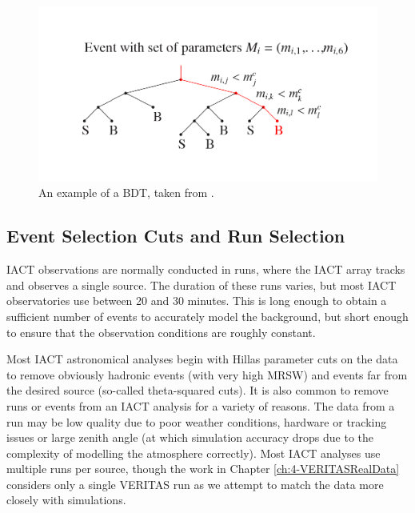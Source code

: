 \begin{figure}[ht] 
        \centering \includegraphics[width=\columnwidth]{figures/forest_picture.png}
        \caption{
                \label{fig:bdtstruct} %
                An example of a BDT, taken from \cite{hessbdt}.
        }
\end{figure}

\subsection{Event Selection Cuts and Run Selection}

IACT observations are normally conducted in runs, where the IACT array tracks and observes a single source. The duration of these runs varies, but most IACT observatories use between 20 and 30 minutes. This is long enough to obtain a sufficient number of events to accurately model the background, but short enough to ensure that the observation conditions are roughly constant.

Most IACT astronomical analyses begin with Hillas parameter cuts on the data to remove obviously hadronic events (with very high MRSW) and events far from the desired source (so-called theta-squared cuts). It is also common to remove runs or events from an IACT analysis for a variety of reasons. The data from a run may be low quality due to poor weather conditions, hardware or tracking issues or large zenith angle (at which simulation accuracy drops due to the complexity of modelling the atmosphere correctly). Most IACT analyses use multiple runs per source, though the work in Chapter \ref{ch:4-VERITASRealData} considers only a single VERITAS run as we attempt to match the data more closely with simulations.

